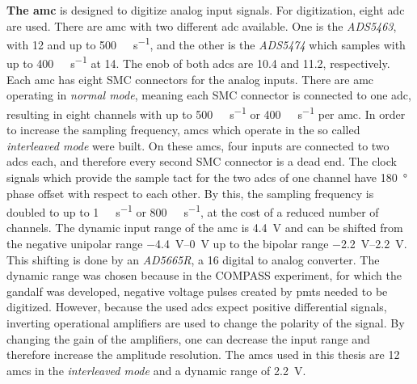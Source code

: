 

\textbf{The \ac{amc}} is designed to digitize analog input signals.
For digitization, eight \ac{adc} are used.
There are \ac{amc} with two different \ac{adc} available.
One is the \textit{ADS5463}, with \SI{12}{\bit} and up to \SI{500}{\mega\sample\per\second}, and the other is the \textit{ADS5474} which samples with up to \SI{400}{\mega\sample\per\second} at \SI{14}{\bit}.
The \ac{enob} of both \acp{adc} are \SI{10.4}{\bit} and \SI{11.2}{\bit}, respectively.
Each \ac{amc} has eight SMC connectors for the analog inputs.
There are \ac{amc} operating in \textit{normal mode}, meaning each SMC connector is connected to one \ac{adc}, resulting in eight channels with up to \SI{500}{\mega\sample\per\second} or \SI{400}{\mega\sample\per\second} per \ac{amc}.
In order to increase the sampling frequency, \acp{amc} which operate in the so called \textit{interleaved mode} were built.
On these \acp{amc}, four inputs are connected to two \ac{adc}s each, and therefore every second SMC connector is a dead end.
The clock signals which provide the sample tact for the two \acp{adc} of one channel have \SI{180}{\degree} phase offset with respect to each other.
By this, the sampling frequency is doubled to up to \SI{1}{\giga\sample\per\second} or \SI{800}{\mega\sample\per\second}, at the cost of a reduced number of channels.
The dynamic input range of the \ac{amc} is \SI{4.4}{\volt} and can be shifted from the negative unipolar range \SIrange{-4.4}{0}{\volt} up to the bipolar range \SIrange{-2.2}{2.2}{\volt}.
This shifting is done by an \textit{AD5665R}, a \SI{16}{\bit} digital to analog converter.
The dynamic range was chosen because in the COMPASS experiment, for which the \ac{gandalf} was developed, negative voltage pulses created by \acp{pmt} needed to be digitized.
However, because the used \acp{adc} expect positive differential signals, inverting operational amplifiers are used to change the polarity of the signal.
By changing the gain of the amplifiers, one can decrease the input range and therefore increase the amplitude resolution.
The \acp{amc} used in this thesis are \SI{12}{\bit} \acp{amc} in the \textit{interleaved mode} and a dynamic range of \SI{2.2}{\volt}.



